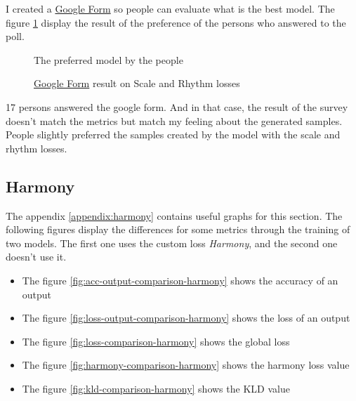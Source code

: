 \documentclass[12pt]{report}
\begin{document}
I created a \href{https://docs.google.com/forms/d/e/1FAIpQLSckCvIg1mZdXlh1fSv_yG68dEbfQRN-WwkGG2KVdcjQ4rQgbw/viewform?usp=sf_link}{Google Form} so people can evaluate what is the best model.
The figure \ref{fig:pie:scale-loss} display the result of the preference of the persons who answered to the poll.

\begin{figure}
    \begin{center}
    \caption{\href{https://docs.google.com/forms/d/e/1FAIpQLSckCvIg1mZdXlh1fSv_yG68dEbfQRN-WwkGG2KVdcjQ4rQgbw/viewform?usp=sf_link}{Google Form} result on Scale and Rhythm losses}
    The preferred model by the people
    \label{fig:pie:scale-loss}
    \end{center}
\end{figure}

17 persons answered the google form.
And in that case, the result of the survey doesn't match the metrics but match my feeling about the generated samples.
People slightly preferred the samples created by the model with the scale and rhythm losses.



\subsection{Harmony}
\label{sec:exp:harmony}


The appendix \ref{appendix:harmony} contains useful graphs for this section.
The following figures display the differences for some metrics through the training of two models.
The first one uses the custom loss \textit{Harmony}, and the second one doesn't use it.
\begin{itemize}
    \item The figure \ref{fig:acc-output-comparison-harmony} shows the accuracy of an output
    \item The figure \ref{fig:loss-output-comparison-harmony} shows the loss of an output
    \item The figure \ref{fig:loss-comparison-harmony} shows the global loss
    \item The figure \ref{fig:harmony-comparison-harmony} shows the harmony loss value
    \item The figure \ref{fig:kld-comparison-harmony} shows the KLD value
\end{itemize}
\end{document}
